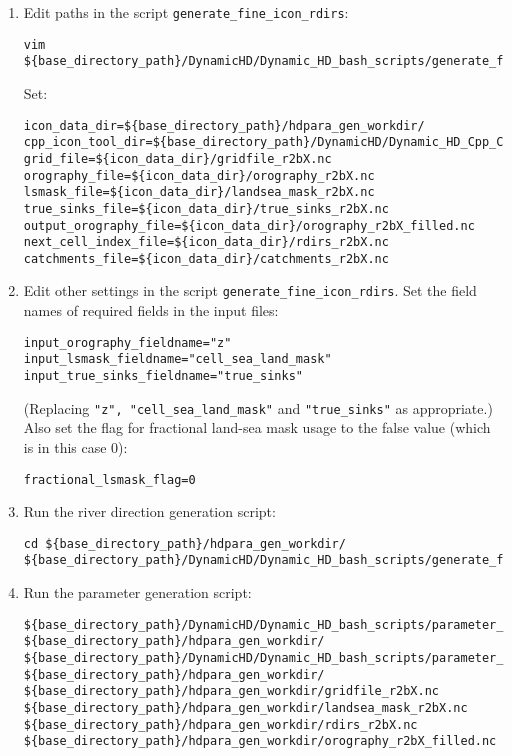 \documentclass{article}
\begin{document}
\begin{enumerate}
\item Edit paths in the script \lstinline[style=bash_input]{generate_fine_icon_rdirs}:
\begin{lstlisting}[style=bash_input,breaklines=true] 
vim ${base_directory_path}/DynamicHD/Dynamic_HD_bash_scripts/generate_fine_icon_rdirs
\end{lstlisting}
Set:
\begin{lstlisting}[style=bash_input,breaklines=true] 
icon_data_dir=${base_directory_path}/hdpara_gen_workdir/
cpp_icon_tool_dir=${base_directory_path}/DynamicHD/Dynamic_HD_Cpp_Code/Release
grid_file=${icon_data_dir}/gridfile_r2bX.nc
orography_file=${icon_data_dir}/orography_r2bX.nc
lsmask_file=${icon_data_dir}/landsea_mask_r2bX.nc
true_sinks_file=${icon_data_dir}/true_sinks_r2bX.nc
output_orography_file=${icon_data_dir}/orography_r2bX_filled.nc
next_cell_index_file=${icon_data_dir}/rdirs_r2bX.nc
catchments_file=${icon_data_dir}/catchments_r2bX.nc
 \end{lstlisting}
 \item Edit other settings in the script \lstinline[style=bash_input]{generate_fine_icon_rdirs}. Set the field names of required fields in the input files:
\begin{lstlisting}[style=bash_input,breaklines=true]
input_orography_fieldname="z"
input_lsmask_fieldname="cell_sea_land_mask"
input_true_sinks_fieldname="true_sinks"
\end{lstlisting}
(Replacing  \lstinline[style=bash_input]{"z", "cell_sea_land_mask"} and  \lstinline[style=bash_input]{"true_sinks"} as appropriate.) Also set the flag for fractional land-sea mask usage to the false value (which is in this case 0):
\begin{lstlisting}[style=bash_input,breaklines=true]
fractional_lsmask_flag=0 
\end{lstlisting}
\item Run the river direction generation script:
\begin{lstlisting}[style=bash_input,breaklines=true]
cd ${base_directory_path}/hdpara_gen_workdir/
${base_directory_path}/DynamicHD/Dynamic_HD_bash_scripts/generate_fine_icon_rdirs
\end{lstlisting}
\item Run the parameter generation script:
\begin{lstlisting}[style=bash_input,breaklines=true]
${base_directory_path}/DynamicHD/Dynamic_HD_bash_scripts/parameter_generation_scripts/generate_icon_hd_file_driver.sh ${base_directory_path}/hdpara_gen_workdir/ ${base_directory_path}/DynamicHD/Dynamic_HD_bash_scripts/parameter_generation_scripts/fortran ${base_directory_path}/hdpara_gen_workdir/ ${base_directory_path}/hdpara_gen_workdir/gridfile_r2bX.nc ${base_directory_path}/hdpara_gen_workdir/landsea_mask_r2bX.nc ${base_directory_path}/hdpara_gen_workdir/rdirs_r2bX.nc ${base_directory_path}/hdpara_gen_workdir/orography_r2bX_filled.nc

\end{lstlisting}
\end{enumerate}
\end{document}
